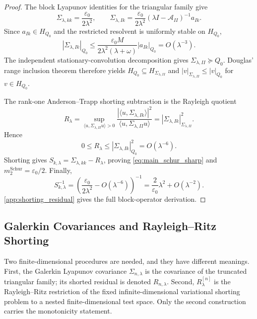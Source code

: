 \documentclass[preprint,12pt]{elsarticle}
\theoremstyle{plain}
\theoremstyle{definition}
\theoremstyle{remark}
\begin{document}
    \begin{proof}
        The block Lyapunov identities for the triangular family give
        \[
            \Sigma_{\lambda,kk}=\frac{\varepsilon_0}{2\lambda^2},
            \qquad
            \Sigma_{\lambda,Ik}
            =
            \frac{\varepsilon_0}{2\lambda^2}
            (\lambda I-\mathcal{A}_{II})^{-1}a_{Ik}.
        \]
        Since $a_{Ik}\in H_{Q_0}$ and the restricted resolvent is uniformly
        stable on $H_{Q_0}$,
        \[
            |\Sigma_{\lambda,Ik}|_{Q_0}
            \le
            \frac{\varepsilon_0 M}{2\lambda^2(\lambda+\omega)}
            |a_{Ik}|_{Q_0}
            =
            O(\lambda^{-3}).
        \]
        The independent stationary-convolution decomposition gives
        $\Sigma_{\lambda,II}\succeq Q_0$.  Douglas' range inclusion theorem
        therefore yields $H_{Q_0}\subseteq H_{\Sigma_{\lambda,II}}$ and
        $|v|_{\Sigma_{\lambda,II}}\le |v|_{Q_0}$ for $v\in H_{Q_0}$.

        The rank-one An\-der\-son--Trapp shorting subtraction is the
        Rayleigh quotient
        \[
            R_\lambda
            =
            \sup_{\langle u,\Sigma_{\lambda,II}u\rangle>0}
            \frac{|\langle u,\Sigma_{\lambda,Ik}\rangle|^2}
                 {\langle u,\Sigma_{\lambda,II}u\rangle}
            =
            |\Sigma_{\lambda,Ik}|_{\Sigma_{\lambda,II}}^2.
        \]
        Hence
        \[
            0\le R_\lambda
            \le |\Sigma_{\lambda,Ik}|_{Q_0}^2
            =
            O(\lambda^{-6}).
        \]
        Shorting gives
        $S_{k,\lambda}=\Sigma_{\lambda,kk}-R_\lambda$, proving
        \eqref{eq:main_schur_sharp} and
        $m_2^{\mathrm{Schur}}=\varepsilon_0/2$.  Finally,
        \[
            S_{k,\lambda}^{-1}
            =
            \left(\frac{\varepsilon_0}{2\lambda^2}-O(\lambda^{-6})\right)^{-1}
            =
            \frac{2}{\varepsilon_0}\lambda^2+O(\lambda^{-2}).
        \]
        \ref{app:shorting_residual} gives the full block-operator
        derivation.
    \end{proof}

    \subsection{Galerkin Covariances and Rayleigh--Ritz Shorting}
    \label{sec:proofs:convergence}

    Two finite-dimensional procedures are needed, and they have different
    meanings.  First, the Galerkin Lyapunov covariance
    $\Sigma_{n,\lambda}$ is the covariance of the truncated triangular family;
    its shorted residual is denoted $R_{n,\lambda}$.  Second,
    $R_\lambda^{[n]}$ is the Rayleigh--Ritz restriction of the fixed
    infinite-dimensional variational shorting problem to a nested
    finite-dimensional test space.  Only the second construction carries the
    monotonicity statement.
\end{document}
